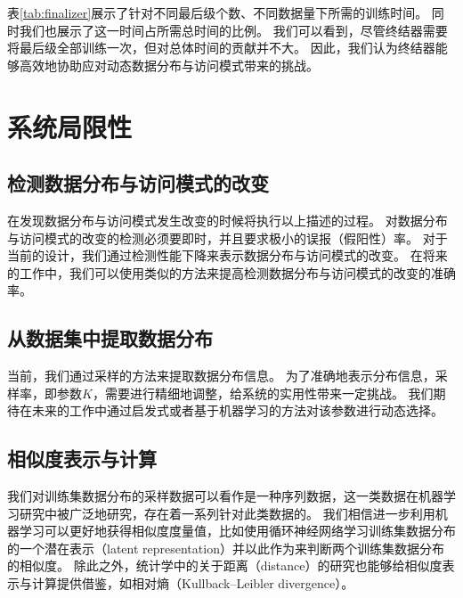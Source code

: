 表\ref{tab:finalizer}展示了针对不同{\rmi}最后级{\model}个数、不同数据量下所需的训练时间。
同时我们也展示了这一时间占{\sys}所需总时间的比例。
我们可以看到，尽管终结器需要将{\rmi}最后级{\model}全部训练一次，但对总体时间的贡献并不大。
因此，我们认为终结器能够高效地协助{\sys}应对动态数据分布与访问模式带来的挑战。

\section{系统局限性}

\subsection{检测数据分布与访问模式的改变}

{\sys}在发现数据分布与访问模式发生改变的时候将执行以上描述的过程。
对数据分布与访问模式的改变的检测必须要即时，并且要求极小的误报（假阳性）率。
对于当前的设计，我们通过检测性能下降来表示数据分布与访问模式的改变。
在将来的工作中，我们可以使用类似\cite{kang2017noscope}的方法来提高检测数据分布与访问模式的改变的准确率。


\subsection{从数据集中提取数据分布}
当前，我们通过采样的方法来提取数据分布信息。
为了准确地表示分布信息，采样率，即参数$K$，需要进行精细地调整，给系统的实用性带来一定挑战。
我们期待在未来的工作中通过启发式或者基于机器学习的方法对该参数进行动态选择。


\subsection{相似度表示与计算}
我们对训练集数据分布的采样数据可以看作是一种序列数据，这一类数据在机器学习研究中被广泛地研究，存在着一系列针对此类数据的{\model}\cite{krizhevsky2012imagenet, szegedy2015going, simonyan2014very}。
我们相信进一步利用机器学习可以更好地获得相似度度量值，比如使用循环神经网络学习训练集数据分布的一个潜在表示（latent representation）并以此作为{\model}来判断两个训练集数据分布的相似度。
除此之外，统计学中的关于距离（distance）的研究也能够给相似度表示与计算提供借鉴，如相对熵（Kullback–Leibler divergence）。

